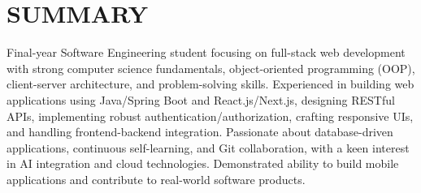\section{SUMMARY}
\noindent Final-year Software Engineering student focusing on full-stack web development with strong computer science fundamentals, object-oriented programming (OOP), client-server architecture, and problem-solving skills. Experienced in building web applications using Java/Spring Boot and React.js/Next.js, designing RESTful APIs, implementing robust authentication/authorization, crafting responsive UIs, and handling frontend-backend integration. Passionate about database-driven applications, continuous self-learning, and Git collaboration, with a keen interest in AI integration and cloud technologies. Demonstrated ability to build mobile applications and contribute to real-world software products.
